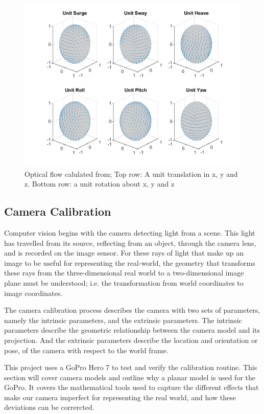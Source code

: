 \documentclass{UoNMCHA}
\numberwithin{equation}{section}
\begin{document}
\begin{figure}[ht]\label{fig:Unit_Movement}
    \begin{center}
        \includegraphics[width=.8\linewidth]{Figures/Unit_Movement}
        \caption{Optical flow calulated from; Top row: A unit translation in x, y and z. Bottom row: a unit rotation about x, y and z}
    \end{center}
\end{figure}

\newpage
\subsection{Camera Calibration}\label{sec:Background_cameraCal} %
Computer vision begins with the camera detecting light from a scene. This light has travelled from its source, reflecting from an object, through the camera lens, and is recorded on the image sensor. For these rays of light that make up an image to be useful for representing the real-world, the geometry that transforms these rays from the three-dimensional real world to a two-dimensional image plane must be understood; i.e. the transformation from world coordinates to image coordinates.

The camera calibration process describes the camera with two sets of parameters, namely the intrinsic parameters, and the extrinsic parameters. The intrinsic parameters describe the geometric relationship between the camera model and its projection. And the extrinsic parameters describe the location and orientation or pose, of the camera with respect to the world frame.

This project uses a GoPro Hero 7 to test and verify the calibration routine. This section will cover camera models and outline why a planar model is used for the GoPro. It covers the mathematical tools used to capture the different effects that make our camera imperfect for representing the real world, and how these deviations can be corrercted.
\end{document}
